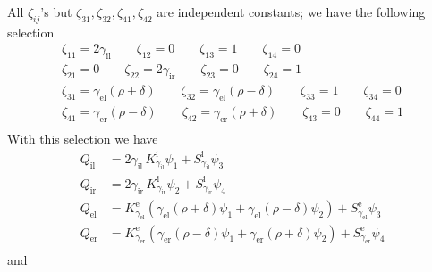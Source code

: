 All $\zeta_{ij}$'s but $\zeta_{31},\zeta_{32},\zeta_{41},\zeta_{42}$ are independent constants; we have the following selection 
\begin{gather*}
  \zeta_{11} = 2\gamma_\text{il} \qquad \zeta_{12} =0 \qquad \zeta_{13} = 1 \qquad \zeta_{14} = 0\\
  \zeta_{21} = 0 \qquad \zeta_{22} = 2\gamma_\text{ir} \qquad \zeta_{23} = 0 \qquad
\zeta_{24} = 1\\
  \zeta_{31} = \gamma_\text{el}(\rho + \delta) \qquad \zeta_{32} = \gamma_\text{el}(\rho - \delta) \qquad \zeta_{33} = 1 \qquad \zeta_{34} = 0\\
  \zeta_{41} = \gamma_\text{er}(\rho - \delta) \qquad \zeta_{42} = \gamma_\text{er}(\rho + \delta) \qquad \zeta_{43} = 0 \qquad \zeta_{44} = 1\\
\end{gather*}
With this selection we have
\begin{align*}
  Q_\text{il} &= 2\gamma_\text{il}\,K^\text{i}_{\gamma_\text{il}}\psi_1 + S^\text{i}_{\gamma_\text{il}}\psi_3 \\
  Q_\text{ir} &= 2\gamma_\text{ir}\,K^\text{i}_{\gamma_\text{ir}}\psi_2 + S^\text{i}_{\gamma_\text{ir}}\psi_4 \\
  Q_\text{el} &= K^{\text{e}}_{\gamma_\text{el}} (\gamma_\text{el} (\rho+\delta)\psi_1 +\gamma_\text{el} (\rho-\delta)\psi_2) + S^{\text{e}}_{\gamma_\text{el}}\psi_3 
 \\
  Q_\text{er} &= K^{\text{e}}_{\gamma_\text{er}} (\gamma_\text{er}(\rho-\delta)\psi_1 + \gamma_\text{er}(\rho+\delta)\psi_2) + S^{\text{e}}_{\gamma_\text{er}}\psi_4 \\
\end{align*}
and

